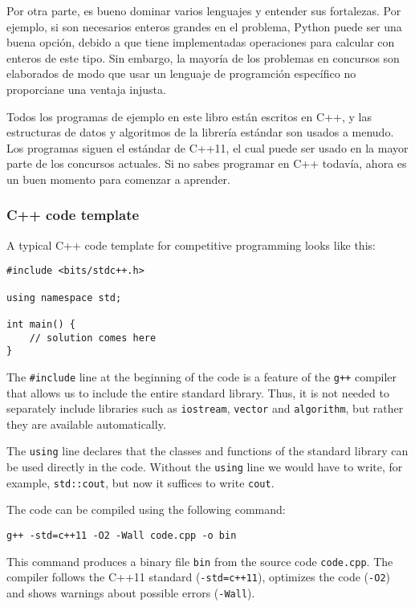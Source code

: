 Por otra parte, es bueno dominar varios lenguajes
y entender sus fortalezas. Por ejemplo, si son
necesarios enteros grandes en el problema,
Python puede ser una buena opci\'on, debido
a que tiene implementadas operaciones para
calcular con enteros de este tipo.
Sin embargo, la mayor\'ia de los problemas
en concursos son elaborados de modo que usar
un lenguaje de programci\'on espec\'ifico
no proporciane una ventaja injusta.

Todos los programas de ejemplo en este libro est\'an
escritos en C++, y las estructuras de datos y
algoritmos de la librer\'ia est\'andar son usados
a menudo. Los programas siguen el est\'andar de C++11,
el cual puede ser usado en la mayor parte de los
concursos actuales. Si no sabes programar en
C++ todav\'ia, ahora es un buen momento
para comenzar a aprender.

\subsubsection{C++ code template}

A typical C++ code template for competitive programming
looks like this:

\begin{lstlisting}
#include <bits/stdc++.h>

using namespace std;

int main() {
    // solution comes here
}
\end{lstlisting}

The \texttt{\#include} line at the beginning
of the code is a feature of the \texttt{g++} compiler
that allows us to include the entire standard library.
Thus, it is not needed to separately include
libraries such as \texttt{iostream},
\texttt{vector} and \texttt{algorithm},
but rather they are available automatically.

The \texttt{using} line declares
that the classes and functions
of the standard library can be used directly
in the code.
Without the \texttt{using} line we would have
to write, for example, \texttt{std::cout},
but now it suffices to write \texttt{cout}.

The code can be compiled using the following command:

\begin{lstlisting}
g++ -std=c++11 -O2 -Wall code.cpp -o bin
\end{lstlisting}

This command produces a binary file \texttt{bin}
from the source code \texttt{code.cpp}.
The compiler follows the C++11 standard
(\texttt{-std=c++11}),
optimizes the code (\texttt{-O2})
and shows warnings about possible errors (\texttt{-Wall}).

